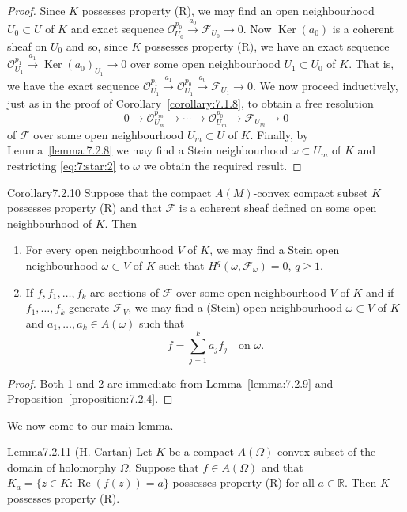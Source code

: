 \begin{proof}
Since $K$ possesses property (R), we may find an open neighbourhood $U_0\subset U$ of $K$ and exact sequence $\mathcal{O}_{U_0}^{p_0}\xrightarrow{a_0}\mathcal{F}_{U_0}\to0$. Now $\operatorname{Ker}(a_0)$ is a coherent sheaf on $U_0$ and so, since $K$ possesses property (R), we have an exact sequence $\mathcal{O}_{U_1}^{p_1}\xrightarrow{a_1}\operatorname{Ker}(a_0)_{U_1}\to0$ over some open neighbourhood $U_1\subset U_0$ of $K$. That is, we have the exact sequence $\mathcal{O}_{U_1}^{p_1}\xrightarrow{a_1}\mathcal{O}_{U_1}^{p_0}\xrightarrow{a_0}\mathcal{F}_{U_1}\to0$. We now proceed inductively, just as in the proof of Corollary~\ref{corollary:7.1.8}, to obtain a free resolution
\[
0\to\mathcal{O}_{U_m}^{p_m}\to\cdots\to\mathcal{O}_{U_m}^{p_0}\to\mathcal{F}_{U_m}\to0\tag{*}\label{eq:7:star:2}
\]
of $\mathcal{F}$ over some open neighbourhood $U_m\subset U$ of $K$. Finally, by Lemma~\ref{lemma:7.2.8} we may find a Stein neighbourhood $\omega\subset U_m$ of $K$ and restricting \eqref{eq:7:star:2} to $\omega$ we obtain the required result.
\end{proof}
\begin{originaltheorem}{Corollary}{7.2.10}
Suppose that the compact $A(M)$-convex compact subset $K$ possesses property (R) and that $\mathcal{F}$ is a coherent sheaf defined on some open neighbourhood of $K$. Then
\begin{enumerate}[label=\arabic*.]
\item For every open neighbourhood $V$ of $K$, we may find a Stein open neighbourhood $\omega\subset V$ of $K$ such that $H^q(\omega,\mathcal{F}_\omega)=0$, $q\geq1$.
\item If $f,f_1,\ldots,f_k$ are sections of $\mathcal F$ over some open neighbourhood $V$ of $K$ and if $f_1,\ldots,f_k$ generate $\mathcal F_V$, we may find a (Stein) open neighbourhood $\omega\subset V$ of $K$ and $a_1,\ldots,a_k\in A(\omega)$ such that
\[
f=\sum_{j=1}^k a_jf_j\quad\text{on }\omega.
\]
\end{enumerate}
\end{originaltheorem}
\begin{proof}
Both 1 and 2 are immediate from Lemma~\ref{lemma:7.2.9} and Proposition~\ref{proposition:7.2.4}.
\end{proof}
We now come to our main lemma.
\begin{originaltheorem}{Lemma}{7.2.11 (H. Cartan)}
Let $K$ be a compact $A(\Omega)$-convex subset of the domain of holomorphy $\Omega$. Suppose that $f\in A(\Omega)$ and that $K_a=\{z\in K:\operatorname{Re}(f(z))=a\}$ possesses property (R) for all $a\in\mathbb R$. Then $K$ possesses property (R).
\end{originaltheorem}
